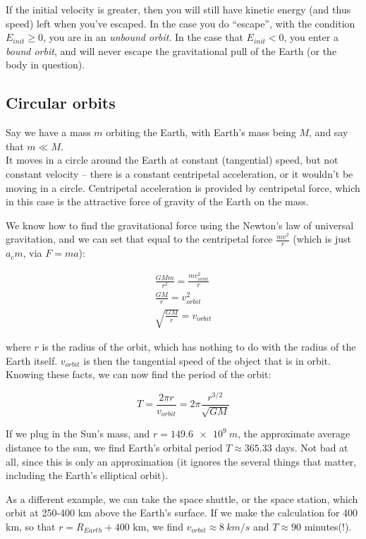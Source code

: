 If the initial velocity is greater, then you will still have kinetic energy (and thus speed) left when you've escaped. In the case you do ``escape'', with the condition $E_{init} \ge 0$, you are in an \emph{unbound orbit}. In the case that $E_{init} < 0$, you enter a \emph{bound orbit}, and will never escape the gravitational pull of the Earth (or the body in question).

\subsection{Circular orbits}

Say we have a mass $m$ orbiting the Earth, with Earth's mass being $M$, and say that $m \ll M$.\\
It moves in a circle around the Earth at constant (tangential) speed, but not constant velocity -- there is a constant centripetal acceleration, or it wouldn't be moving in a circle. Centripetal acceleration is provided by centripetal force, which in this case is the attractive force of gravity of the Earth on the mass.

We know how to find the gravitational force using the Newton's law of universal gravitation, and we can set that equal to the centripetal force $\frac{m v^2}{r}$ (which is just $a_c m$, via $F = m a$):

\begin{align}
\frac{G M m}{r^2} = \frac{m v_{orbit}^2}{r}\\
\frac{G M}{r} = v_{orbit}^2\\
\sqrt{\frac{G M}{r}} = v_{orbit}
\end{align}

where $r$ is the radius of the orbit, which has nothing to do with the radius of the Earth itself. $v_{orbit}$ is then the tangential speed of the object that is in orbit. Knowing these facts, we can now find the period of the orbit:

\begin{equation}
T = \frac{2 \pi r}{v_{orbit}} = 2 \pi \frac{r^{3/2}}{\sqrt{G M}}
\end{equation}

If we plug in the Sun's mass, and $r = \SI{149.6e9}{m}$, the approximate average distance to the sun, we find Earth's orbital period $T \approx 365.33$ days. Not bad at all, since this is only an approximation (it ignores the several things that matter, including the Earth's elliptical orbit).

As a different example, we can take the space shuttle, or the space station, which orbit at 250-400 km above the Earth's surface. If we make the calculation for 400 km, so that $r = R_{Earth} + 400$ km, we find $v_{orbit} \approx \SI{8}{km/s}$ and $T \approx 90$ minutes(!).

